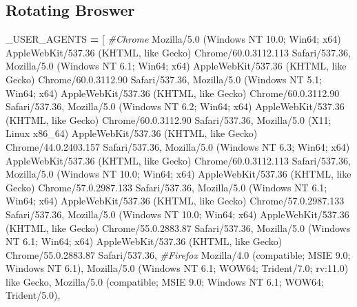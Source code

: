\documentclass[
]{book}
\newenvironment{Shaded}{\begin{snugshade}}{\end{snugshade}}
\newcommand{\CommentTok}[1]{\textcolor[rgb]{0.37,0.37,0.37}{\textit{#1}}}
\newcommand{\NormalTok}[1]{#1}
\newcommand{\OperatorTok}[1]{\textcolor[rgb]{0.43,0.43,0.43}{\textbf{#1}}}
\newcommand{\StringTok}[1]{\textcolor[rgb]{0.5,0.5,0.5}{#1}}
\begin{document}
\hypertarget{rotating-broswer}{%
\subsection{Rotating Broswer}\label{rotating-broswer}}

\begin{Shaded}
\begin{Highlighting}[]
\NormalTok{\_USER\_AGENTS }\OperatorTok{=}\NormalTok{ [}
   \CommentTok{\#Chrome}
    \StringTok{\textquotesingle{}Mozilla/5.0 (Windows NT 10.0; Win64; x64) AppleWebKit/537.36 (KHTML, like Gecko) Chrome/60.0.3112.113 Safari/537.36\textquotesingle{}}\NormalTok{,}
    \StringTok{\textquotesingle{}Mozilla/5.0 (Windows NT 6.1; Win64; x64) AppleWebKit/537.36 (KHTML, like Gecko) Chrome/60.0.3112.90 Safari/537.36\textquotesingle{}}\NormalTok{,}
    \StringTok{\textquotesingle{}Mozilla/5.0 (Windows NT 5.1; Win64; x64) AppleWebKit/537.36 (KHTML, like Gecko) Chrome/60.0.3112.90 Safari/537.36\textquotesingle{}}\NormalTok{,}
    \StringTok{\textquotesingle{}Mozilla/5.0 (Windows NT 6.2; Win64; x64) AppleWebKit/537.36 (KHTML, like Gecko) Chrome/60.0.3112.90 Safari/537.36\textquotesingle{}}\NormalTok{,}
    \StringTok{\textquotesingle{}Mozilla/5.0 (X11; Linux x86\_64) AppleWebKit/537.36 (KHTML, like Gecko) Chrome/44.0.2403.157 Safari/537.36\textquotesingle{}}\NormalTok{,}
    \StringTok{\textquotesingle{}Mozilla/5.0 (Windows NT 6.3; Win64; x64) AppleWebKit/537.36 (KHTML, like Gecko) Chrome/60.0.3112.113 Safari/537.36\textquotesingle{}}\NormalTok{,}
    \StringTok{\textquotesingle{}Mozilla/5.0 (Windows NT 10.0; Win64; x64) AppleWebKit/537.36 (KHTML, like Gecko) Chrome/57.0.2987.133 Safari/537.36\textquotesingle{}}\NormalTok{,}
    \StringTok{\textquotesingle{}Mozilla/5.0 (Windows NT 6.1; Win64; x64) AppleWebKit/537.36 (KHTML, like Gecko) Chrome/57.0.2987.133 Safari/537.36\textquotesingle{}}\NormalTok{,}
    \StringTok{\textquotesingle{}Mozilla/5.0 (Windows NT 10.0; Win64; x64) AppleWebKit/537.36 (KHTML, like Gecko) Chrome/55.0.2883.87 Safari/537.36\textquotesingle{}}\NormalTok{,}
    \StringTok{\textquotesingle{}Mozilla/5.0 (Windows NT 6.1; Win64; x64) AppleWebKit/537.36 (KHTML, like Gecko) Chrome/55.0.2883.87 Safari/537.36\textquotesingle{}}\NormalTok{,}
    \CommentTok{\#Firefox}
    \StringTok{\textquotesingle{}Mozilla/4.0 (compatible; MSIE 9.0; Windows NT 6.1)\textquotesingle{}}\NormalTok{,}
    \StringTok{\textquotesingle{}Mozilla/5.0 (Windows NT 6.1; WOW64; Trident/7.0; rv:11.0) like Gecko\textquotesingle{}}\NormalTok{,}
    \StringTok{\textquotesingle{}Mozilla/5.0 (compatible; MSIE 9.0; Windows NT 6.1; WOW64; Trident/5.0)\textquotesingle{}}\NormalTok{,}

\end{Highlighting}
\end{Shaded}
\end{document}
